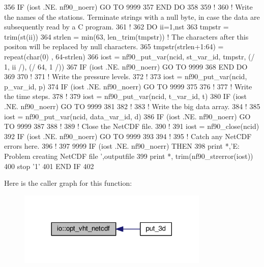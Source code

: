 \begin{DoxyCode}
356         \textcolor{keywordflow}{IF} (iost .NE. nf90\_noerr) \textcolor{keywordflow}{GO TO} 9999
357 \textcolor{keywordflow}{    END DO}
358 
359     \textcolor{comment}{!}
360     \textcolor{comment}{! Write the names of the stations. Terminate strings with a null byte, in case the data are
       subsequently read by a C program.}
361     \textcolor{comment}{!}
362     \textcolor{keywordflow}{DO} ii=1,nst
363         tmpstr  = trim(st(ii))
364         strlen  = min(63, len\_trim(tmpstr))           \textcolor{comment}{! The characters after this positon will be replaced
       by null characters.}
365         tmpstr(strlen+1:64)    = repeat(char(0) , 64-strlen)
366         iost    = nf90\_put\_var(ncid, st\_var\_id, tmpstr, (/ 1, ii /), (/ 64, 1 /))
367         \textcolor{keywordflow}{IF} (iost .NE. nf90\_noerr) \textcolor{keywordflow}{GO TO} 9999
368 \textcolor{keywordflow}{    END DO}
369 
370     \textcolor{comment}{!}
371     \textcolor{comment}{! Write the pressure levels.}
372     \textcolor{comment}{!}
373     iost    = nf90\_put\_var(ncid, p\_var\_id, p)
374     \textcolor{keywordflow}{IF} (iost .NE. nf90\_noerr) \textcolor{keywordflow}{GO TO} 9999
375 
376     \textcolor{comment}{!}
377     \textcolor{comment}{! Write the time steps.}
378     \textcolor{comment}{!}
379     iost    = nf90\_put\_var(ncid, t\_var\_id, t)
380     \textcolor{keywordflow}{IF} (iost .NE. nf90\_noerr) \textcolor{keywordflow}{GO TO} 9999
381 
382     \textcolor{comment}{!}
383     \textcolor{comment}{! Write the big data array.}
384     \textcolor{comment}{!}
385     iost    = nf90\_put\_var(ncid, data\_var\_id, d)
386     \textcolor{keywordflow}{IF} (iost .NE. nf90\_noerr) \textcolor{keywordflow}{GO TO} 9999
387 
388     \textcolor{comment}{!}
389     \textcolor{comment}{! Close the NetCDF file.}
390     \textcolor{comment}{!}
391     iost    = nf90\_close(ncid)
392     \textcolor{keywordflow}{IF} (iost .NE. nf90\_noerr) \textcolor{keywordflow}{GO TO} 9999
393 
394     \textcolor{comment}{!}
395     \textcolor{comment}{! Catch any NetCDF errors here.}
396     \textcolor{comment}{!}
397     9999 \textcolor{keywordflow}{IF} (iost .NE. nf90\_noerr) \textcolor{keywordflow}{THEN}
398         print *,\textcolor{stringliteral}{'E: Problem creating NetCDF file '},outputfile
399         print *, trim(nf90\_strerror(iost))
400         stop \textcolor{stringliteral}{'1'}
401 \textcolor{keywordflow}{    END IF}
402 
\end{DoxyCode}


Here is the caller graph for this function\+:\nopagebreak
\begin{figure}[H]
\begin{center}
\leavevmode
\includegraphics[width=257pt]{namespaceio_a1feb605e982e6696d29a63e635b8d3e1_icgraph}
\end{center}
\end{figure}


